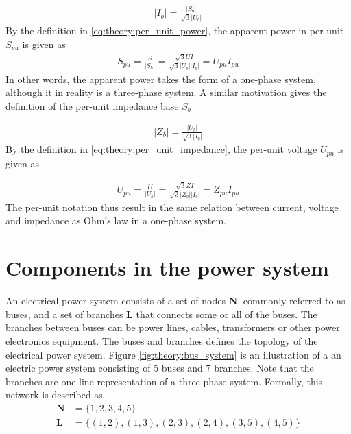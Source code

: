 \documentclass[class=book, crop=false]{standalone}
\begin{document}
\begin{equation}
   \begin{aligned}\label{eq:theory:per_unit_current}
|I_{b}| = \frac{|S_{b}|}{\sqrt{3}|U_{b}|}
\end{aligned} 
\end{equation}
By the definition in \eqref{eq:theory:per_unit_power}, the apparent power in per-unit $S_{pu}$ is given as 
\begin{equation}
   \begin{aligned}\label{eq:theory:per_unit_power}
S_{pu} = \frac{S}{|S_{b}|}
        = \frac{\sqrt{3}UI}{\sqrt{3}|U_{b}||I_{b}|}
        = U_{pu}I_{pu}
\end{aligned} 
\end{equation}
In other words, the apparent power takes the form of a one-phase system, although it in reality is a three-phase system. A similar motivation gives the definition of the per-unit impedance base $S_{b}$

\begin{equation}
   \begin{aligned}\label{eq:theory:per_unit_impedance}
|Z_{b}| = \frac{|U_{b}|}{\sqrt{3}|I_{b}|}
\end{aligned} 
\end{equation}
By the definition in \eqref{eq:theory:per_unit_impedance}, the per-unit voltage $U_{pu}$ is given as 

\begin{equation}
   \begin{aligned}\label{eq:theory:per_unit_impedance_ohm}
U_{pu} = \frac{U}{|U_{b}|}
        = \frac{\sqrt{3}ZI}{\sqrt{3}|Z_{b}||I_{b}|}
        = Z_{pu}I_{pu}
\end{aligned} 
\end{equation}
The per-unit notation thus result in the same relation between current, voltage and impedance as Ohm's law in a one-phase system. 

\section{Components in the power system}
An electrical power system consists of a set of nodes \textbf{N}, commonly referred to as buses, and a set of branches \textbf{L} that connects some or all of the buses. The branches between buses can be power lines, cables, transformers or other power electronics equipment. The buses and branches defines the topology of the electrical power system. Figure \ref{fig:theory:bus_system} is an illustration of a an electric power system consisting of 5 buses and 7 branches. Note that the branches are one-line representation of a three-phase system. Formally, this network is described as 
\begin{equation}
   \begin{aligned}\label{eq:theory:network_set}
\textbf{N} &= \{1,2,3,4,5\}\\
\textbf{L} &= \{(1,2),(1,3),(2,3),(2,4),(3,5),(4,5)\}
\end{aligned} 
\end{equation}
\end{document}
